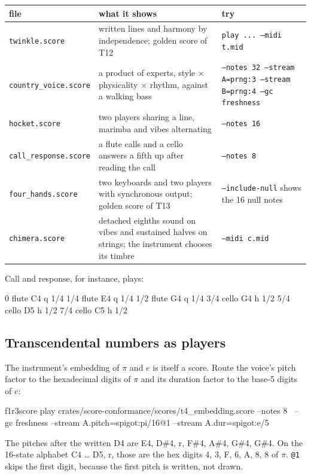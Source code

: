 \documentclass[11pt,a4paper]{article}
\newcommand{\ttx}[1]{\texttt{#1}}
\begin{document}
\begin{center}
\small
\begin{tabularx}{\linewidth}{@{}l>{\raggedright\arraybackslash}X>{\raggedright\arraybackslash}p{4.4cm}@{}}
\toprule
file & what it shows & try \\
\midrule
\ttx{twinkle.score} & written lines and harmony by independence; golden score
  of T12 & \ttx{play ... --midi t.mid} \\
\ttx{country\_voice.score} & a product of experts, style $\times$
  physicality $\times$ rhythm, against a walking bass & \ttx{--notes 32
  --stream A=prng:3 --stream B=prng:4 --gc freshness} \\
\ttx{hocket.score} & two players sharing a line, marimba and vibes
  alternating & \ttx{--notes 16} \\
\ttx{call\_response.score} & a flute calls and a cello answers a fifth up
  after reading the call & \ttx{--notes 8} \\
\ttx{four\_hands.score} & two keyboards and two players with synchronous
  output; golden score of T13 & \ttx{--include-null} shows the 16 null notes \\
\ttx{chimera.score} & detached eighths sound on vibes and sustained halves on
  strings; the instrument chooses its timbre & \ttx{--midi c.mid} \\
\bottomrule
\end{tabularx}
\end{center}

\noindent Call and response, for instance, plays:
\begin{out}
         0  flute      C4     q          1/4
       1/4  flute      E4     q          1/4
       1/2  flute      G4     q          1/4
       3/4  cello      G4     h          1/2
       5/4  cello      D5     h          1/2
       7/4  cello      C5     h          1/2
\end{out}

\subsection{Transcendental numbers as players}

The instrument's embedding of $\pi$ and $e$ is itself a score. Route the
voice's pitch factor to the hexadecimal digits of $\pi$ and its duration factor
to the base-5 digits of $e$:
\begin{shell}
f1r3score play crates/score-conformance/scores/t4_embedding.score --notes 8 \
  --gc freshness --stream A.pitch=spigot:pi/16@1 --stream A.dur=spigot:e/5
\end{shell}
\noindent The pitches after the written D4 are E4, D\#4, r, F\#4, A\#4, G\#4,
G\#4. On the 16-state alphabet C4 \dots{} D5, r, those are the hex digits 4,
3, F, 6, A, 8, 8 of $\pi$. \ttx{@1} skips the first digit, because the first
pitch is written, not drawn.
\end{document}

